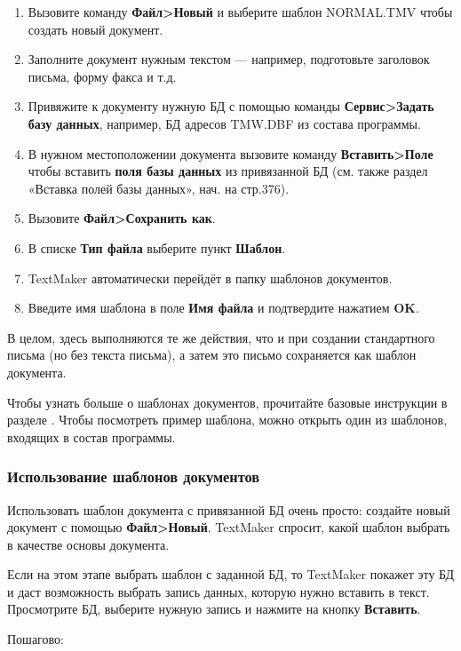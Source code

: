 ﻿\documentclass[a4paper,10pt]{article}
\begin{document}
\begin{enumerate}
 \item Вызовите команду \textbf{Файл>Новый} и выберите шаблон NORMAL.TMV чтобы создать новый документ.
 \item Заполните документ нужным текстом — например, подготовьте заголовок письма, форму факса и т.д.
 \item Привяжите к документу нужную БД с помощью команды \textbf{Сервис>Задать базу данных}, например, БД адресов TMW.DBF из состава программы.
 \item В нужном местоположении документа вызовите команду \textbf{Вставить>Поле} чтобы вставить \textbf{поля базы данных} из привязанной БД (см. также раздел «Вставка полей базы данных», нач. на стр.376).
 \item Вызовите \textbf{Файл>Сохранить как}.
 \item В списке \textbf{Тип файла} выберите пункт \textbf{Шаблон}.
 \item TextMaker автоматически перейдёт в папку шаблонов документов.
 \item Введите имя шаблона в поле \textbf{Имя файла} и подтвердите нажатием \textbf{OK}.
\end{enumerate}

В целом, здесь выполняются те же действия, что и при создании стандартного письма (но без текста письма), а затем это письмо сохраняется как шаблон документа.

Чтобы узнать больше о шаблонах документов, прочитайте базовые инструкции в разделе . Чтобы посмотреть пример шаблона, можно открыть один из шаблонов, входящих в состав программы.

\subsubsection{Использование шаблонов документов}
Использовать шаблон документа с привязанной БД очень просто: создайте новый документ с помощью \textbf{Файл>Новый}. TextMaker спросит, какой шаблон выбрать в качестве основы документа.

Если на этом этапе выбрать шаблон с заданной БД, то TextMaker покажет эту БД и даст возможность выбрать запись данных, которую нужно вставить в текст. Просмотрите БД, выберите нужную запись и нажмите на кнопку \textbf{Вставить}.

Пошагово:
\end{document}
